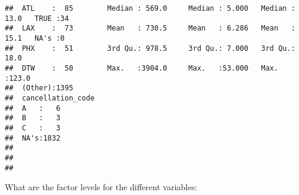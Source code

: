 \documentclass{article}\usepackage[]{graphicx}\usepackage[]{color}
\makeatletter
\newenvironment{kframe}{%
 \def\at@end@of@kframe{}%
 \ifinner\ifhmode%
  \def\at@end@of@kframe{\end{minipage}}%
  \begin{minipage}{\columnwidth}%
 \fi\fi%
 \def\FrameCommand##1{\hskip\@totalleftmargin \hskip-\fboxsep
 \colorbox{shadecolor}{##1}\hskip-\fboxsep
     \hskip-\linewidth \hskip-\@totalleftmargin \hskip\columnwidth}%
 \MakeFramed {\advance\hsize-\width
   \@totalleftmargin\z@ \linewidth\hsize
   \@setminipage}}%
 {\par\unskip\endMakeFramed%
 \at@end@of@kframe}
\newenvironment{knitrout}{}{} %
\makeatother
\begin{document}
\begin{knitrout}
\begin{kframe}
\begin{verbatim}
##  ATL    :  85        Median : 569.0     Median : 5.000   Median : 13.0   TRUE :34       
##  LAX    :  73        Mean   : 730.5     Mean   : 6.286   Mean   : 15.1   NA's :0        
##  PHX    :  51        3rd Qu.: 978.5     3rd Qu.: 7.000   3rd Qu.: 18.0                  
##  DTW    :  50        Max.   :3904.0     Max.   :53.000   Max.   :123.0                  
##  (Other):1395                                                                           
##  cancellation_code
##  A   :   6        
##  B   :   3        
##  C   :   3        
##  NA's:1832        
##                   
##                   
## 
\end{verbatim}
\end{kframe}
\end{knitrout}

What are the factor levels for the different variables:
\end{document}
